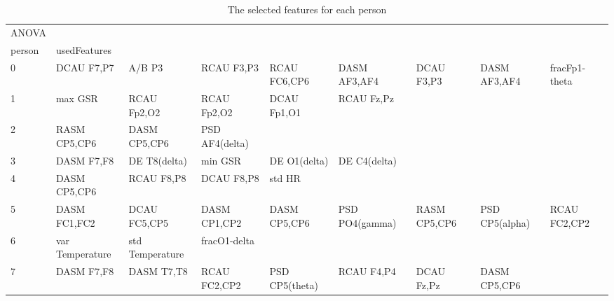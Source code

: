 \clearpage
\begin{landscape}
\begin{table}[]
\centering
\caption{The selected features for each person}
\begin{tabular}{l|llllllll}
ANOVA              &                      &                         &                      &                    &                       &                      &                 &                 \\
person             & usedFeatures         &                         &                      &                    &                       &                      &                 &                 \\
0                  & DCAU F7,P7           & A/B P3                  & RCAU F3,P3           & RCAU FC6,CP6       & DASM AF3,AF4          & DCAU F3,P3           & DASM AF3,AF4    & fracFp1-theta   \\
1                  & max GSR              & RCAU Fp2,O2             & RCAU Fp2,O2          & DCAU Fp1,O1        & RCAU Fz,Pz            &                      &                 &                 \\
2                  & RASM CP5,CP6         & DASM CP5,CP6            & PSD AF4(delta)       &                    &                       &                      &                 &                 \\
3                  & DASM F7,F8           & DE T8(delta)            & min GSR              & DE O1(delta)       & DE C4(delta)          &                      &                 &                 \\
4                  & DASM CP5,CP6         & RCAU F8,P8              & DCAU F8,P8           & std HR             &                       &                      &                 &                 \\
5                  & DASM FC1,FC2         & DCAU FC5,CP5            & DASM CP1,CP2         & DASM CP5,CP6       & PSD PO4(gamma)        & RASM CP5,CP6         & PSD CP5(alpha)  & RCAU FC2,CP2    \\
6                  & var Temperature      & std Temperature         & fracO1-delta         &                    &                       &                      &                 &                 \\
7                  & DASM F7,F8           & DASM T7,T8              & RCAU FC2,CP2         & PSD CP5(theta)     & RCAU F4,P4            & DCAU Fz,Pz           & DASM CP5,CP6    &                 \\

\end{tabular}
\end{table}
\end{landscape}
